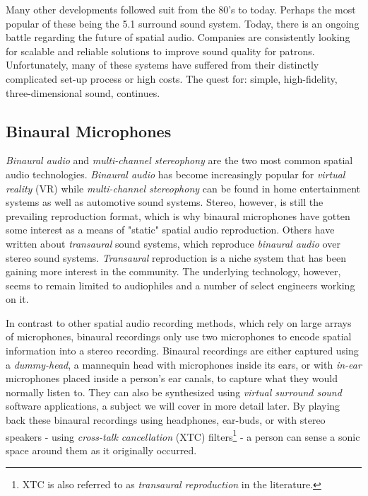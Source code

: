 Many other developments followed suit from the 80's to today. Perhaps the most popular of these being the 5.1 surround sound system. Today, there is an ongoing battle regarding the future of spatial audio. Companies are consistently looking for scalable and reliable solutions to improve sound quality for patrons. Unfortunately, many of these systems have suffered from their distinctly complicated set-up process or high costs. The quest for: simple, high-fidelity, three-dimensional sound, continues. 

\subsection{Binaural Microphones}

\textit{Binaural audio} and \textit{multi-channel stereophony} are the two most common spatial audio technologies. \textit{Binaural audio} has become increasingly popular for \textit{virtual reality} (VR) while \textit{multi-channel stereophony} can be found in home entertainment systems as well as automotive sound systems. Stereo, however, is still the prevailing reproduction format, which is why binaural microphones have gotten some interest as a means of "static" spatial audio reproduction. Others have written about \textit{transaural} sound systems, which reproduce \textit{binaural audio} over stereo sound systems. \textit{Transaural} reproduction is a niche system that has been gaining more interest in the community. The underlying technology, however, seems to remain limited to audiophiles and a number of select engineers working on it.

In contrast to other spatial audio recording methods, which rely on large arrays of microphones, binaural recordings only use two microphones to encode spatial information into a stereo recording. Binaural recordings are either captured using a \textit{dummy-head}, a mannequin head with microphones inside its ears, or with \textit{in-ear} microphones placed inside a person's ear canals, to capture what they would normally listen to. They can also be synthesized using \textit{virtual surround sound} software applications, a subject we will cover in more detail later. By playing back these binaural recordings using headphones, ear-buds, or with stereo speakers - using \textit{cross-talk cancellation} (XTC) filters\footnote{XTC is also referred to as \textit{transaural reproduction} in the literature.} - a person can sense a sonic space around them as it originally occurred. 

